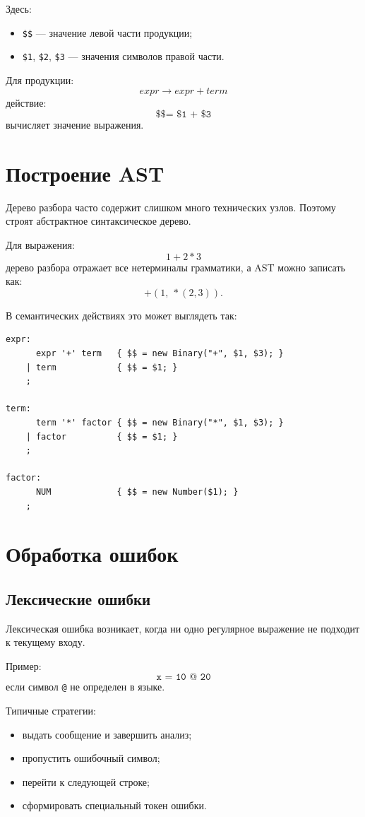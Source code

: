 \documentclass[12pt,a4paper]{article}
\begin{document}
Здесь:
\begin{itemize}
    \item \texttt{\$\$} --- значение левой части продукции;
    \item \texttt{\$1}, \texttt{\$2}, \texttt{\$3} --- значения символов правой части.
\end{itemize}

Для продукции:
\[
expr \to expr + term
\]
действие:
\[
\texttt{\$\$ = \$1 + \$3}
\]
вычисляет значение выражения.

\section{Построение AST}

Дерево разбора часто содержит слишком много технических узлов. Поэтому строят абстрактное синтаксическое дерево.

Для выражения:
\[
1 + 2 * 3
\]
дерево разбора отражает все нетерминалы грамматики, а AST можно записать как:
\[
+(1,\ *(2,3)).
\]

В семантических действиях это может выглядеть так:

\begin{lstlisting}
expr:
      expr '+' term   { $$ = new Binary("+", $1, $3); }
    | term            { $$ = $1; }
    ;

term:
      term '*' factor { $$ = new Binary("*", $1, $3); }
    | factor          { $$ = $1; }
    ;

factor:
      NUM             { $$ = new Number($1); }
    ;
\end{lstlisting}

\section{Обработка ошибок}

\subsection{Лексические ошибки}

Лексическая ошибка возникает, когда ни одно регулярное выражение не подходит к текущему входу.

Пример:
\[
\texttt{x = 10 @ 20}
\]
если символ \texttt{@} не определен в языке.

Типичные стратегии:
\begin{itemize}
    \item выдать сообщение и завершить анализ;
    \item пропустить ошибочный символ;
    \item перейти к следующей строке;
    \item сформировать специальный токен ошибки.
\end{itemize}
\end{document}
